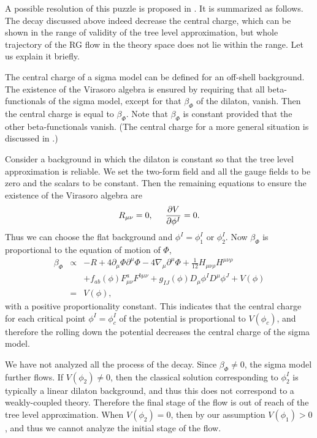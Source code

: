 \documentclass[a4paper,a4paper]{article}
\begin{document}
\vspace{3mm}

A possible resolution of this puzzle is proposed in \cite{suyama}. 
It is summarized as follows. 
The decay discussed above indeed decrease the central charge, which can be shown in the range of validity of the 
tree level approximation, but whole trajectory of the RG flow in the theory space does not lie within the range. 
Let us explain it briefly. 

The central charge of a sigma model can be defined for an off-shell background. 
The existence of the Virasoro algebra is ensured by requiring that all beta-functionals of the sigma model, 
except for that $\beta_{\Phi}$ of the dilaton, vanish. 
Then the central charge is equal to $\beta_{\Phi}$. 
Note that $\beta_{\Phi}$ is constant provided that the other beta-functionals vanish. 
(The central charge for a more general situation is discussed in \cite{Tseytlin}.) 

Consider a background in which the dilaton is constant so that the tree level approximation is reliable. 
We set the two-form field and all the gauge fields to be zero and the scalars to be constant. 
Then the remaining equations to ensure the existence of the Virasoro algebra are 
\begin{equation}
R_{\mu\nu}=0, \hspace{5mm} \frac{\partial V}{\partial \phi^I}=0.
\end{equation}
Thus we can choose the flat background and $\phi^I=\phi^I_1$ or $\phi^I_2$. 
Now $\beta_{\Phi}$ is proportional to the equation of motion of $\Phi$, 
\begin{eqnarray}
\beta_{\Phi} &\propto& 
-R+4\partial_\mu\Phi\partial^\mu\Phi-4\nabla_\mu\partial^\mu\Phi
+\frac1{12}H_{\mu\nu\rho}H^{\mu\nu\rho}
        \nonumber \\
  & &+f_{ab}(\phi)F_{\mu\nu}^aF^{b\mu\nu}+g_{IJ}(\phi)D_\mu\phi^ID^\mu\phi^J+V(\phi) \nonumber \\
  &=& V(\phi),
\end{eqnarray}
with a positive proportionality constant. 
This indicates that the central charge for each critical point $\phi^I=\phi^I_c$ of the potential is 
proportional to $V(\phi_c)$, and therefore the rolling down the potential decreases the central 
charge of the sigma model. 

We have not analyzed all the process of the decay. 
Since $\beta_{\Phi}\ne 0$, the sigma model further flows. 
If $V(\phi_2)\ne0$, then the classical solution corresponding to $\phi^I_2$ is typically a linear 
dilaton background, and thus this does not correspond to a weakly-coupled theory. 
Therefore the final stage of the flow is out of reach of the tree level approximation. 
When $V(\phi_2)=0$, then by our assumption $V(\phi_1)>0$, and thus we cannot analyze the initial stage of 
the flow. 
\end{document}
